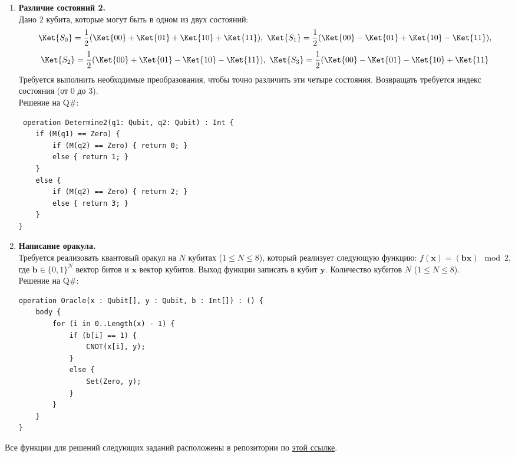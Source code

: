 \documentclass{article}
\begin{document}
\begin{enumerate}
        \item \textbf{Различие состояний 2.}\\
        Дано $2$ кубита, которые могут быть в одном из двух состояний:
        $$\Ket{S_0} = \frac{1}{2}(\Ket{00} + \Ket{01} + \Ket{10} + \Ket{11}), \ \Ket{S_1} = \frac{1}{2}(\Ket{00} - \Ket{01} + \Ket{10} - \Ket{11}),$$
        $$\Ket{S_2} = \frac{1}{2}(\Ket{00} + \Ket{01} - \Ket{10} - \Ket{11}), \ \Ket{S_3} = \frac{1}{2}(\Ket{00} - \Ket{01} - \Ket{10} + \Ket{11}$$
        Требуется выполнить необходимые преобразования, чтобы точно различить эти четыре состояния. Возвращать требуется индекс состояния (от $0$ до $3$).\\
        Решение на Q\#: 
        \begin{verbatim}
 operation Determine2(q1: Qubit, q2: Qubit) : Int {
    if (M(q1) == Zero) {
        if (M(q2) == Zero) { return 0; } 
        else { return 1; }
    }
    else {
        if (M(q2) == Zero) { return 2; } 
        else { return 3; }
    }
}
    \end{verbatim}
    
    \item \textbf{Написание оракула.}\\
    Требуется реализовать квантовый оракул на $N$ кубитах ($1 \le N \le 8$), который реализует следующую функцию: $f(\pmb{x}) = (\pmb{b}\pmb{x}) \mod 2$, где  $\pmb{b} \in \{0,1\}^N$ вектор битов и  $\pmb{x}$ вектор кубитов. Выход функции записать в кубит $\pmb{y}$. Количество кубитов $N$ ($1 \le N \le 8$).\\
    Решение на Q\#: 
    \begin{verbatim}
operation Oracle(x : Qubit[], y : Qubit, b : Int[]) : () {
    body {
        for (i in 0..Length(x) - 1) {
            if (b[i] == 1) {
                CNOT(x[i], y);
            } 
            else {
                Set(Zero, y);
            }
        }
    }
} 
    \end{verbatim}
    \end{enumerate}
    
    Все функции для решений следующих заданий расположены в репозитории по \href{https://github.com/NRU-MPEI-IMAI/tm-and-qc-IliaTrofimov/blob/main/task-3.qs}{этой ссылке}.
    
\end{document}
